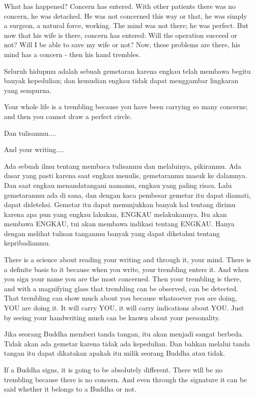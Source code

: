 \english
What has happened? Concern has entered. With other patients there was no concern, he was detached. He was not concerned this way or that, he was simply a surgeon, a natural force, working. The mind was not there; he was perfect. But now that his wife is there, concern has entered: Will the operation succeed or not? Will I be able to save my wife or not? Now, these problems are there, his mind has a concern - then his hand trembles.

\bahasa
Seluruh hidupmu adalah sebuah gemetaran karena engkau telah membawa begitu banyak kepedulian; dan kemudian engkau tidak dapat menggambar lingkaran yang sempurna.

\english
Your whole life is a trembling because you have been carrying so many concerns; and then you cannot draw a perfect circle.

\bahasa
Dan tulisanmu....

\english
And your writing....

\bahasa
Ada sebuah ilmu tentang membaca tulisanmu dan melaluinya, pikiranmu. Ada dasar yang pasti karena saat engkau menulis, gemetaranmu masuk ke dalamnya. Dan saat engkau menandatangani namamu, engkau yang paling risau. Lalu gemetaranmu ada di sana, dan dengan kaca pembesar gemetar itu dapat diamati, dapat dideteksi. Gemetar itu dapat menunjukkan banyak hal tentang dirimu karena apa pun yang engkau lakukan, ENGKAU melakukannya. Itu akan membawa ENGKAU, tui akan membawa indikasi tentang ENGKAU. Hanya dengan melihat tulisan tanganmu banyak yang dapat diketahui tentang kepribadianmu.

\english
There is a science about reading your writing and through it, your mind. There is a definite basis to it because when you write, your trembling enters it. And when you sign your name you are the most concerned. Then your trembling is there, and with a magnifying glass that trembling can be observed, can be detected. That trembling can show much about you because whatsoever you are doing, YOU are doing it. It will carry YOU, it will carry indications about YOU. Just by seeing your handwriting much can be known about your personality.

\bahasa
Jika seorang Buddha memberi tanda tangan, itu akan menjadi sangat berbeda. Tidak akan ada gemetar karena tidak ada kepedulian. Dan bahkan melalui tanda tangan itu dapat dikatakan apakah itu milik seorang Buddha atau tidak.

\english
If a Buddha signs, it is going to be absolutely different. There will be no trembling because there is no concern. And even through the signature it can be said whether it belongs to a Buddha or not.

